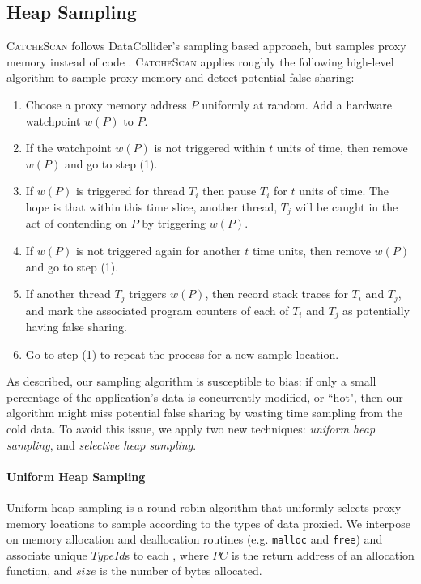 \documentclass{sig-alternate}
\newcommand{\TextToolname}{CatcheScan}
\newcommand{\Toolname}{\textsc{\TextToolname{}}}
\begin{document}
\subsection{Heap Sampling}\label{sec:heapsample}

\Toolname{} follows DataCollider's sampling based approach, but samples proxy memory instead of code \cite{DataCollider}.
\Toolname{} applies roughly the following high-level algorithm to sample proxy memory and detect potential false sharing:
\begin{enumerate}
\item Choose a proxy memory address $P$ uniformly at random. Add a hardware watchpoint $w(P)$ to $P$.
\item If the watchpoint $w(P)$ is not triggered within $t$ units of time, then remove $w(P)$ and go to step (1).
\item If $w(P)$ is triggered for thread $T_i$ then pause $T_i$ for $t$ units of time. The hope is that within this
time slice, another thread, $T_j$ will be caught in the act of contending on $P$ by triggering $w(P)$.
\item If $w(P)$ is not triggered again for another $t$ time units, then remove $w(P)$ and go to step (1).
\item If another thread $T_j$ triggers $w(P)$, then record stack traces for $T_i$ and $T_j$, and mark the associated program
counters of each of $T_i$ and $T_j$ as potentially having false sharing.
\item Go to step (1) to repeat the process for a new sample location.
\end{enumerate}

As described, our sampling algorithm is susceptible to bias: if only a small percentage of the application's data is concurrently
modified, or ``hot", then our algorithm might miss potential false sharing by wasting time sampling from the cold data.
To avoid this issue, we apply two new techniques: \emph{uniform heap sampling}, and \emph{selective heap sampling}.

\newcommand\TypeId{$TypeId$}

\paragraph{Uniform Heap Sampling}
Uniform heap sampling is a round-robin algorithm that uniformly selects proxy memory locations to sample according to
the types of data proxied. We interpose on memory allocation and deallocation routines (e.g. \texttt{malloc} and \texttt{free})
and associate unique \TypeId{}s to each \TypeIdPair{}, where $PC$ is the return address of an allocation function, and $size$ is the
number of bytes allocated.
\end{document}
